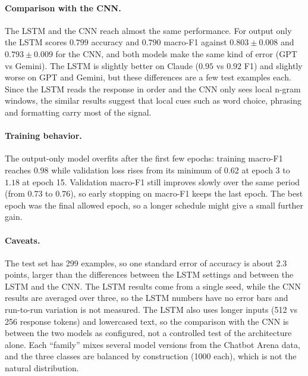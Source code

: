 \paragraph{Comparison with the CNN.} The LSTM and the CNN reach almost the same performance. For output only the LSTM scores $0.799$ accuracy and $0.790$ macro-F1 against $0.803\pm0.008$ and $0.793\pm0.009$ for the CNN, and both models make the same kind of error (GPT vs Gemini). The LSTM is slightly better on Claude ($0.95$ vs $0.92$ F1) and slightly worse on GPT and Gemini, but these differences are a few test examples each. Since the LSTM reads the response in order and the CNN only sees local n-gram windows, the similar results suggest that local cues such as word choice, phrasing and formatting carry most of the signal.

\paragraph{Training behavior.} The output-only model overfits after the first few epochs: training macro-F1 reaches $0.98$ while validation loss rises from its minimum of $0.62$ at epoch 3 to $1.18$ at epoch 15. Validation macro-F1 still improves slowly over the same period (from $0.73$ to $0.76$), so early stopping on macro-F1 keeps the last epoch. The best epoch was the final allowed epoch, so a longer schedule might give a small further gain.

\paragraph{Caveats.} The test set has 299 examples, so one standard error of accuracy is about 2.3 points, larger than the differences between the LSTM settings and between the LSTM and the CNN. The LSTM results come from a single seed, while the CNN results are averaged over three, so the LSTM numbers have no error bars and run-to-run variation is not measured. The LSTM also uses longer inputs (512 vs 256 response tokens) and lowercased text, so the comparison with the CNN is between the two models as configured, not a controlled test of the architecture alone. Each ``family'' mixes several model versions from the Chatbot Arena data, and the three classes are balanced by construction (1000 each), which is not the natural distribution.
